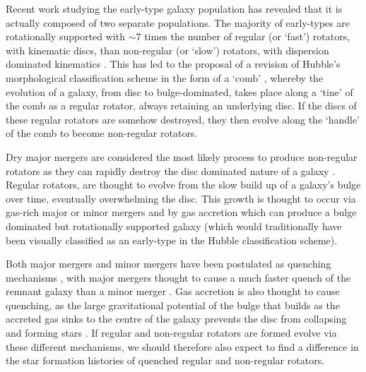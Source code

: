 \documentclass[useAMS,usenatbib]{mn2e}
\begin{document}
Recent work studying the early-type galaxy population has revealed that it is actually composed of two separate populations. The majority of early-types are rotationally supported \citep{emsellem11} with $\sim7$ times the number of regular (or `fast') rotators, with kinematic discs, than non-regular (or `slow') rotators, with dispersion dominated kinematics \citep{cappellari07, emsellem07}.  This has led to the proposal of a revision of Hubble's morphological classification scheme in the form of a `comb' \citep{cappellari16}, whereby the evolution of a galaxy, from  disc to bulge-dominated, takes place along a `tine' of the comb as a regular rotator, always retaining an underlying disc. If the discs of these regular rotators are somehow destroyed, they then evolve along the `handle' of the comb to become non-regular rotators. 

Dry major mergers are considered the most likely process to produce non-regular rotators \citep{duc11, naab14} as they can rapidly destroy the disc dominated nature of a galaxy \citep{toomre72}. %
Regular rotators, are thought to evolve from the slow build up of a galaxy's bulge over time, eventually overwhelming the disc. This growth is thought to occur via gas-rich major or minor mergers \citep{duc11} and by gas accretion \citep{cappellari13, johnston14} which can produce a bulge dominated but rotationally supported galaxy (which would traditionally have been visually classified as an early-type in the Hubble classification scheme). %

Both major mergers and minor mergers have been postulated as quenching mechanisms \citep{hopkins08a, snyder11, hayward14}, with major mergers thought to cause a much faster quench of the remnant galaxy than a minor merger \citep{lotz08b, lotz11}. Gas accretion is also thought to cause quenching, as the large gravitational potential of the bulge that builds as the accreted gas sinks to the centre of the galaxy prevents the disc from collapsing and forming stars \citep{fang13}. If regular and non-regular rotators are formed evolve via these different mechanisms, we should therefore also expect to find a difference in the star formation histories of quenched regular and non-regular rotators. 
\end{document}
